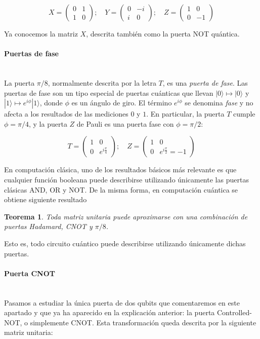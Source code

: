 \documentclass[11pt]{article}
\newcommand{\ra}{\rangle}
\newcommand{\myparagraph}[1]{\paragraph*{#1}\mbox{}\\}
\theoremstyle{plain}
\newtheorem*{theorem*}{Teorema}
\begin{document}
\[
X =
	\begin{pmatrix}
		0 & 1 \\
		1 & 0 
	\end{pmatrix}; \quad
	Y =
	\begin{pmatrix}
		0 & -i \\
		i & 0 
	\end{pmatrix}; \quad
	Z =
	\begin{pmatrix}
		1 & 0 \\
		0 & -1 
	\end{pmatrix}
\]

Ya conocemos la matriz $X$, descrita también como la puerta NOT quántica. \\


\myparagraph{Puertas de fase}


La puerta $\pi/8$, normalmente descrita por la letra $T$, es una \emph{puerta de fase}. Las puertas de fase son un tipo especial de puertas cuánticas que llevan $|0\ra \mapsto |0\ra$ y $|1\ra \mapsto e^{i\phi}|1\ra$, donde $\phi$ es un ángulo de giro. El término $e^{i\phi}$ se denomina \emph{fase} y no afecta a los resultados de las mediciones $0$ y $1$. En particular, la puerta $T$ cumple $\phi = \pi/4$, y la puerta $Z$ de Pauli es una puerta fase con $\phi = \pi/2$:

\[
	T =
	\begin{pmatrix}
		1 & 0 \\
		0 & e^{i\frac{\pi}{4}}
	\end{pmatrix}; \quad
	Z =
	\begin{pmatrix}
		1 & 0 \\
		0 & e^{i\frac{\pi}{2}} = -1
	\end{pmatrix}
\]

En computación clásica, uno de los resultados básicos más relevante es que cualquier función booleana puede describirse utilizando únicamente las puertas clásicas AND, OR y NOT. De la misma forma, en computación cuántica se obtiene siguiente resultado

\begin{theorem*}
	Toda matriz unitaria puede aproximarse con una combinación de puertas Hadamard, CNOT y $\pi/8$.
\end{theorem*}

Esto es, todo circuito cuántico puede describirse utilizando únicamente dichas puertas.


\myparagraph{Puerta CNOT}


Pasamos a estudiar la única puerta de dos qubits que comentaremos en este apartado y que ya ha aparecido en la explicación anterior: la puerta Controlled-NOT, o simplemente CNOT. Esta transformación queda descrita por la siguiente matriz unitaria:
\end{document}
